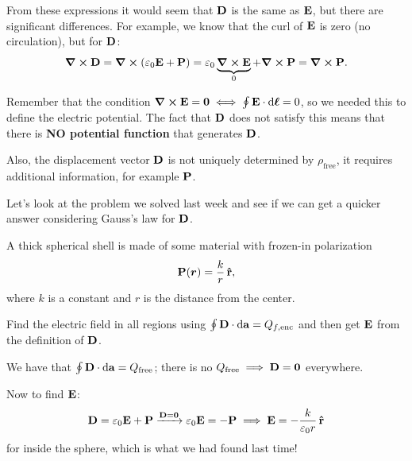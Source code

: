 From these expressions it would seem that $\vb{D}$ is the same as $\vb{E}$, but there are significant differences. For example, we know that the curl of $\vb{E}$ is zero (no circulation), but for $\vb{D}$:
\begin{equation}
    \curl \vb{D} = \curl (\varepsilon_0 \vb{E} + \vb{P}) = \varepsilon_0 \underbrace{\curl \vb{E}}_{0} + \curl \vb{P} = \curl \vb{P}.
\end{equation}

Remember that the condition $\curl \vb{E} = \vb{0} \iff \oint \vb{E} \cdot \dd{\vb*{\ell}} = 0$, so we needed this to define the electric potential. The fact that $\vb{D}$ does not satisfy this means that there is \textbf{NO potential function} that generates $\vb{D}$.

Also, the displacement vector $\vb{D}$ is not uniquely determined by $\rho_{\text{free}}$, it requires additional information, for example $\vb{P}$.

\begin{example}
Let's look at the problem we solved last week and see if we can get a quicker answer considering Gauss's law for $\vb{D}$.

A thick spherical shell is made of some material with frozen-in polarization
\[
\vb{P}(\bm{r}) = \frac{k}{r}\,\vu{r},
\]
where $k$ is a constant and $r$ is the distance from the center.

Find the electric field in all regions using $\oint \vb{D} \cdot \dd{\vb{a}} = Q_{f,\text{enc}}$ and then get $\vb{E}$ from the definition of $\vb{D}$.

We have that $\oint \vb{D} \cdot \dd{\vb{a}} = Q_{\text{free}}$; there is no $Q_{\text{free}} \implies \vb{D} = \vb{0}$ everywhere.

Now to find $\vb{E}$:
\[
\vb{D} = \varepsilon_0 \vb{E} + \vb{P} \xrightarrow{\vb{D}=\vb{0}} \varepsilon_0 \vb{E} = -\vb{P} \implies \vb{E} = -\frac{k}{\varepsilon_0 r}\,\vu{r}
\]
for inside the sphere, which is what we had found last time!
\end{example}

